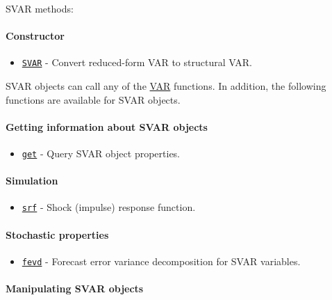 

	SVAR methods:

\paragraph{Constructor}

\begin{itemize}
\itemsep1pt\parskip0pt
\item
  \href{SVAR/SVAR}{\texttt{SVAR}} - Convert reduced-form VAR to
  structural VAR.
\end{itemize}

SVAR objects can call any of the \href{VAR/Contents}{VAR} functions. In
addition, the following functions are available for SVAR objects.

\paragraph{Getting information about SVAR
objects}

\begin{itemize}
\itemsep1pt\parskip0pt
\item
  \href{SVAR/get}{\texttt{get}} - Query SVAR object properties.
\end{itemize}

\paragraph{Simulation}

\begin{itemize}
\itemsep1pt\parskip0pt
\item
  \href{SVAR/srf}{\texttt{srf}} - Shock (impulse) response function.
\end{itemize}

\paragraph{Stochastic properties}

\begin{itemize}
\itemsep1pt\parskip0pt
\item
  \href{SVAR/fevd}{\texttt{fevd}} - Forecast error variance
  decomposition for SVAR variables.
\end{itemize}

\paragraph{Manipulating SVAR objects}


